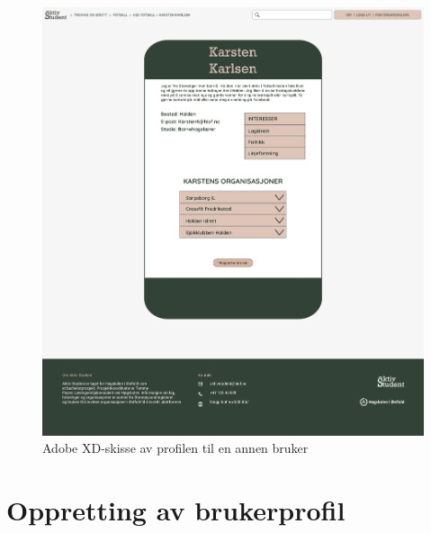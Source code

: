 \begin{figure}[H]
\centering
\includegraphics[width=\textwidth]{Illustrasjoner/Skisser-pdf/3.0/3-7-annen-brukers-profil.pdf}
\caption{Adobe XD-skisse av profilen til en annen bruker}
\label{vedlegg:3-7-annen-bruker}
\end{figure}

\section{Oppretting av brukerprofil}

